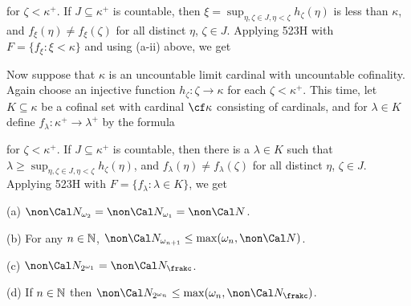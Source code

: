 {

\noindent for $\zeta<\kappa^+$.   If
$J\subseteq\kappa^+$ is countable, then
$\xi=\sup_{\eta,\zeta\in J,\eta<\zeta}h_{\zeta}(\eta)$ is less than
$\kappa$, and
$f_{\xi}(\eta)\ne f_{\xi}(\zeta)$ for all distinct $\eta$, $\zeta\in J$.
Applying 523H with $F=\{f_{\xi}:\xi<\kappa\}$ and using (a-ii) above, we get


\medskip

 Now suppose that $\kappa$ is an uncountable limit cardinal
with uncountable cofinality.   Again choose an injective function
$h_{\zeta}:\zeta\to\kappa$ for each $\zeta<\kappa^+$.
This time, let $K\subseteq\kappa$ be a cofinal set with cardinal
$\cf\kappa$ consisting of cardinals, and for $\lambda\in K$ define
$f_{\lambda}:\kappa^+\to\lambda^+$ by the formula


\noindent for $\zeta<\kappa^+$.   If
$J\subseteq\kappa^+$ is countable, then there is a $\lambda\in K$ such that
$\lambda\ge\sup_{\eta,\zeta\in J,\eta<\zeta}h_{\zeta}(\eta)$, and
$f_{\lambda}(\eta)\ne f_{\lambda}(\zeta)$ for all distinct
$\eta$, $\zeta\in J$.
Applying 523H with $F=\{f_{\lambda}:\lambda\in K\}$, we get

}%

(a) $\non\Cal N_{\omega_2}=\non\Cal N_{\omega_1}=\non\Cal N$.

(b) For any $n\in\Bbb N$,
$\non\Cal N_{\omega_{n+1}}\le\max(\omega_n,\non\Cal N)$.

(c) $\non\Cal N_{2^{\omega_1}}=\non\Cal N_{\frakc}$.

(d) If $n\in\Bbb N$ then
$\non\Cal N_{2^{\omega_n}}\le\max(\omega_n,\non\Cal N_{\frakc})$.

